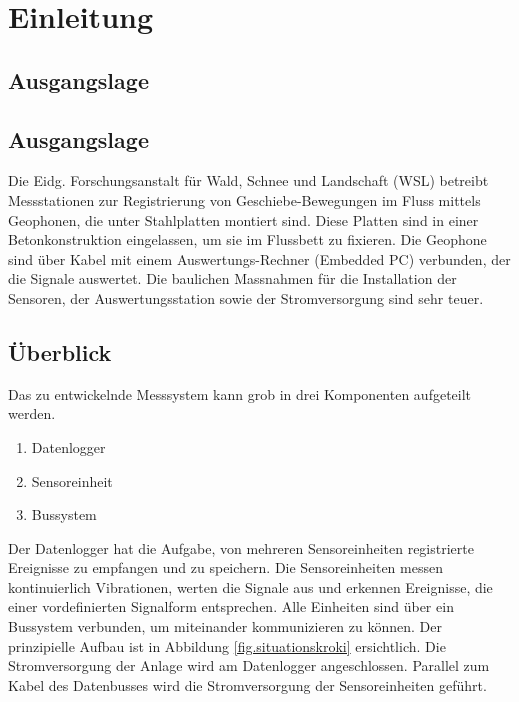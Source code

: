%
%

\chapter{Einleitung}\label{chap.einleitung}

\section{Ausgangslage}
\section{Ausgangslage}\label{sec.ausgangslage}
Die Eidg. Forschungsanstalt für Wald, Schnee und Landschaft (WSL) betreibt Messstationen zur Registrierung von Geschiebe-Bewegungen im Fluss mittels Geophonen, die unter Stahlplatten montiert sind. Diese Platten sind in einer Betonkonstruktion eingelassen, um sie im Flussbett zu fixieren. Die Geophone sind über Kabel mit einem Auswertungs-Rechner (Embedded PC) verbunden, der die Signale auswertet. Die baulichen Massnahmen für die Installation der Sensoren, der Auswertungsstation sowie der Stromversorgung sind sehr teuer. 




\section{Überblick}\label{sec.ueberblick}
Das zu entwickelnde Messsystem kann grob in drei Komponenten aufgeteilt werden. 
\begin{enumerate}
\item Datenlogger
\item Sensoreinheit
\item Bussystem
\end{enumerate}
Der Datenlogger hat die Aufgabe, von mehreren Sensoreinheiten registrierte Ereignisse zu empfangen und zu speichern. Die Sensoreinheiten messen kontinuierlich Vibrationen, werten die Signale aus und erkennen Ereignisse, die einer vordefinierten Signalform entsprechen. Alle Einheiten sind über ein Bussystem verbunden, um miteinander kommunizieren zu können. Der prinzipielle Aufbau ist in Abbildung \ref{fig.situationskroki} ersichtlich. Die Stromversorgung der Anlage wird am Datenlogger angeschlossen. Parallel zum Kabel des Datenbusses wird die Stromversorgung der Sensoreinheiten geführt.

